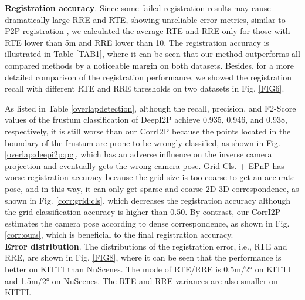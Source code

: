 \documentclass[lettersize,journal]{IEEEtran}
\begin{document}
\noindent\textbf{Registration accuracy}.  Since some failed registration results may cause dramatically large RRE and RTE, showing unreliable error metrics, similar to P2P registration \cite{POINTDSC,HREGNET}, we calculated the average RTE and RRE only for those with RTE lower than 5m and RRE lower than 10. The registration accuracy is illustrated in Table \ref{TAB1}, where it can be seen that our method outperforms all compared methods by a noticeable margin on both datasets. Besides, for a more detailed comparison of the registration performance, we showed the registration recall with different RTE and RRE thresholds on two datasets in Fig. \ref{FIG6}.

As listed in Table \ref{overlapdetection}, although the recall, precision, and F2-Score values of the frustum classification of DeepI2P \cite{DEEPI2P} achieve 0.935, 0.946, and 0.938, respectively,  it is still worse than our CorrI2P because the points located in the boundary of the frustum are prone to be wrongly classified, as shown in Fig. \ref{overlap:deepi2p:pc}, which has an adverse influence on the inverse camera projection and eventually gets the wrong camera pose. Grid Cls. + EPnP has worse registration accuracy because the  grid size is too coarse to get an accurate pose, and in this way, it can only get sparse and coarse 2D-3D correspondence, as shown in Fig. \ref{corr:grid:cls}, which decreases the registration accuracy although the grid classification accuracy is higher than 0.50. By contrast, our CorrI2P estimates the camera pose according to dense correspondence, as shown in Fig. \ref{corr:ours}, which is beneficial to the final registration accuracy. \\

\noindent\textbf{Error distribution}.
The distributions of the registration error, i.e., RTE and RRE, are shown in Fig. \ref{FIG8}, where it can be seen that the performance is better on KITTI than NuScenes. The mode of RTE/RRE is 0.5m/2° on KITTI and 1.5m/2° on NuScenes. The RTE and RRE variances are also smaller on KITTI. \\
\end{document}
